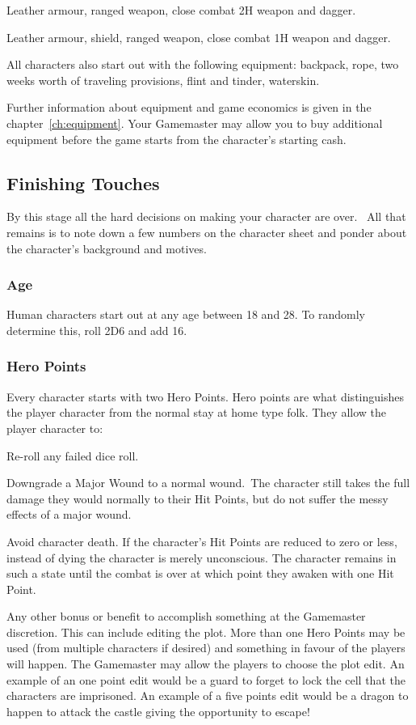 \begin{rpg-list}
	\item Leather armour, ranged weapon, close combat 2H weapon and dagger. 
	\item Leather armour, shield, ranged weapon, close combat 1H weapon and dagger.
\end{rpg-list}

All characters also start out with the following equipment: backpack, rope, two weeks worth of traveling provisions, flint and tinder, waterskin.

Further information about equipment and game economics is given in the chapter~\ref{ch:equipment}. Your Gamemaster may allow you to buy additional equipment before the game starts from the character’s starting cash.

\subsection{Finishing Touches}
By this stage all the hard decisions on making your character are over.  All that remains is to note down a few numbers on the character sheet and ponder about the character’s background and motives.

\subsubsection{Age}
Human characters start out at any age between 18 and 28. To randomly determine this, roll 2D6 and add 16. 

\subsubsection{Hero Points}
Every character starts with two Hero Points. Hero points are what distinguishes the player character from the normal stay at home type folk. They allow the player character to:

\begin{rpg-list}
	\item Re-roll any failed dice roll.
	\item Downgrade a Major Wound to a normal wound. The character still takes the full damage they would normally to their Hit Points, but do not suffer the messy effects of a major wound.
	\item Avoid character death. If the character’s Hit Points are reduced to zero or less, instead of dying the character is merely unconscious. The character remains in such a state until the combat is over at which point they awaken with one Hit Point.
	\item Any other bonus or benefit to accomplish something at the Gamemaster discretion. This can include editing the plot. More than one Hero Points may be used (from multiple characters if desired) and something in favour of the players will happen. The Gamemaster may allow the players to choose the plot edit. An example of an one point edit would be a guard to forget to lock the cell that the characters are imprisoned. An example of a five points edit would be a dragon to happen to attack the castle giving the opportunity to escape!
\end{rpg-list}

